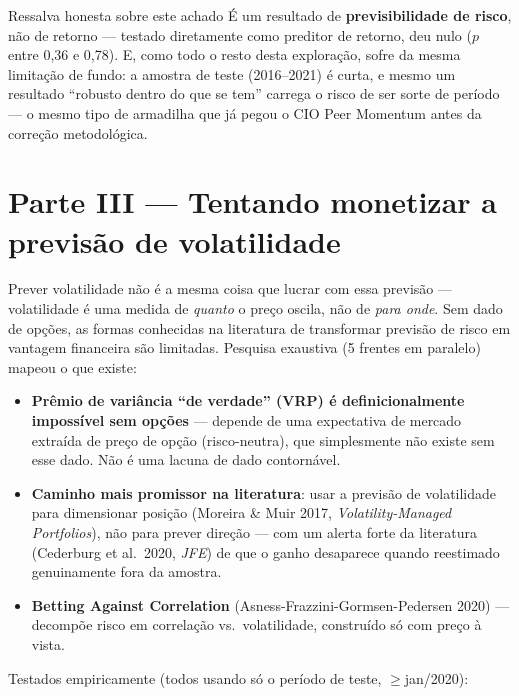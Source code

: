 \documentclass[11pt,a4paper]{article}
\begin{document}
\begin{licao}{Ressalva honesta sobre este achado}
É um resultado de \textbf{previsibilidade de risco}, não de retorno ---
testado diretamente como preditor de retorno, deu nulo ($p$ entre 0,36 e
0,78). E, como todo o resto desta exploração, sofre da mesma limitação de
fundo: a amostra de teste (2016--2021) é curta, e mesmo um resultado
``robusto dentro do que se tem'' carrega o risco de ser sorte de período
--- o mesmo tipo de armadilha que já pegou o CIO Peer Momentum antes da
correção metodológica.
\end{licao}

\section{Parte III --- Tentando monetizar a previsão de volatilidade}
\label{sec:monetizar}

Prever volatilidade não é a mesma coisa que lucrar com essa previsão ---
volatilidade é uma medida de \emph{quanto} o preço oscila, não de
\emph{para onde}. Sem dado de opções, as formas conhecidas na literatura
de transformar previsão de risco em vantagem financeira são limitadas.
Pesquisa exaustiva (5 frentes em paralelo) mapeou o que existe:

\begin{itemize}
\item \textbf{Prêmio de variância ``de verdade'' (VRP) é definicionalmente
impossível sem opções} --- depende de uma expectativa de mercado extraída
de preço de opção (risco-neutra), que simplesmente não existe sem esse
dado. Não é uma lacuna de dado contornável.
\item \textbf{Caminho mais promissor na literatura}: usar a previsão de
volatilidade para dimensionar posição (Moreira \& Muir 2017,
\emph{Volatility-Managed Portfolios}), não para prever direção --- com um
alerta forte da literatura (Cederburg et al.\ 2020, \emph{JFE}) de que o
ganho desaparece quando reestimado genuinamente fora da amostra.
\item \textbf{Betting Against Correlation} (Asness-Frazzini-Gormsen-Pedersen 2020) --- decompõe risco em correlação vs.\ volatilidade, construído só com preço à vista.
\end{itemize}

Testados empiricamente (todos usando só o período de teste, $\geq$jan/2020):
\end{document}
